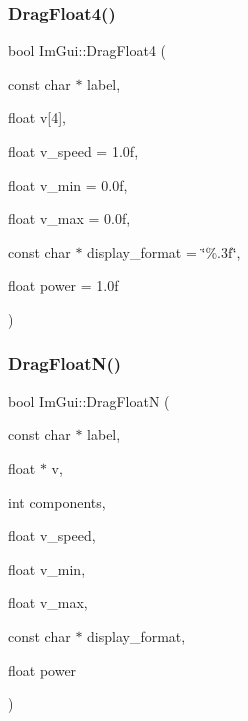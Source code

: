 \subsubsection{\texorpdfstring{Drag\+Float4()}{DragFloat4()}}
{\footnotesize\ttfamily bool Im\+Gui\+::\+Drag\+Float4 (\begin{DoxyParamCaption}\item[{const char $\ast$}]{label,  }\item[{float}]{v\mbox{[}4\mbox{]},  }\item[{float}]{v\+\_\+speed = {\ttfamily 1.0f},  }\item[{float}]{v\+\_\+min = {\ttfamily 0.0f},  }\item[{float}]{v\+\_\+max = {\ttfamily 0.0f},  }\item[{const char $\ast$}]{display\+\_\+format = {\ttfamily \char`\"{}\%.3f\char`\"{}},  }\item[{float}]{power = {\ttfamily 1.0f} }\end{DoxyParamCaption})}

\hypertarget{namespace_im_gui_a2a2764b6f0b3291ad0df4d99127dd751}{}\label{namespace_im_gui_a2a2764b6f0b3291ad0df4d99127dd751} 
\subsubsection{\texorpdfstring{Drag\+Float\+N()}{DragFloatN()}}
{\footnotesize\ttfamily bool Im\+Gui\+::\+Drag\+FloatN (\begin{DoxyParamCaption}\item[{const char $\ast$}]{label,  }\item[{float $\ast$}]{v,  }\item[{int}]{components,  }\item[{float}]{v\+\_\+speed,  }\item[{float}]{v\+\_\+min,  }\item[{float}]{v\+\_\+max,  }\item[{const char $\ast$}]{display\+\_\+format,  }\item[{float}]{power }\end{DoxyParamCaption})}

\hypertarget{namespace_im_gui_ad6e3b0e5a2171679c53d6b18e16a460b}{}\label{namespace_im_gui_ad6e3b0e5a2171679c53d6b18e16a460b} 
